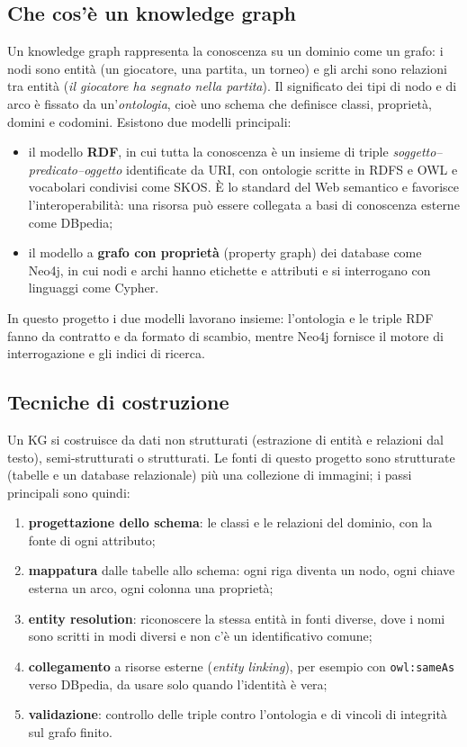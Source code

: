 \documentclass[11pt,a4paper]{article}
\newcommand{\code}[1]{\texttt{\small #1}}
\begin{document}
\subsection{Che cos'è un knowledge graph}
Un knowledge graph rappresenta la conoscenza su un dominio come un grafo: i nodi sono entità (un giocatore, una partita, un torneo) e gli archi sono relazioni tra entità (\emph{il giocatore ha segnato nella partita}). Il significato dei tipi di nodo e di arco è fissato da un'\emph{ontologia}, cioè uno schema che definisce classi, proprietà, domini e codomini. Esistono due modelli principali:
\begin{itemize}
  \item il modello \textbf{RDF}, in cui tutta la conoscenza è un insieme di triple \emph{soggetto--predicato--oggetto} identificate da URI, con ontologie scritte in RDFS e OWL e vocabolari condivisi come SKOS. È lo standard del Web semantico e favorisce l'interoperabilità: una risorsa può essere collegata a basi di conoscenza esterne come DBpedia;
  \item il modello a \textbf{grafo con proprietà} (property graph) dei database come Neo4j, in cui nodi e archi hanno etichette e attributi e si interrogano con linguaggi come Cypher.
\end{itemize}
In questo progetto i due modelli lavorano insieme: l'ontologia e le triple RDF fanno da contratto e da formato di scambio, mentre Neo4j fornisce il motore di interrogazione e gli indici di ricerca.

\subsection{Tecniche di costruzione}
Un KG si costruisce da dati non strutturati (estrazione di entità e relazioni dal testo), semi-strutturati o strutturati. Le fonti di questo progetto sono strutturate (tabelle e un database relazionale) più una collezione di immagini; i passi principali sono quindi:
\begin{enumerate}
  \item \textbf{progettazione dello schema}: le classi e le relazioni del dominio, con la fonte di ogni attributo;
  \item \textbf{mappatura} dalle tabelle allo schema: ogni riga diventa un nodo, ogni chiave esterna un arco, ogni colonna una proprietà;
  \item \textbf{entity resolution}: riconoscere la stessa entità in fonti diverse, dove i nomi sono scritti in modi diversi e non c'è un identificativo comune;
  \item \textbf{collegamento} a risorse esterne (\emph{entity linking}), per esempio con \code{owl:sameAs} verso DBpedia, da usare solo quando l'identità è vera;
  \item \textbf{validazione}: controllo delle triple contro l'ontologia e di vincoli di integrità sul grafo finito.
\end{enumerate}
\end{document}
